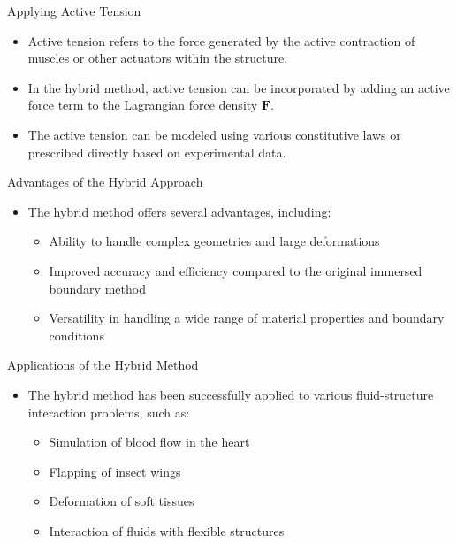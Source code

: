 \documentclass{beamer}
\begin{document}
\begin{frame}{Applying Active Tension}
    \begin{itemize}
        \item Active tension refers to the force generated by the active contraction of muscles or other actuators within the structure.
        \item In the hybrid method, active tension can be incorporated by adding an active force term to the Lagrangian force density $\mathbf{F}$.
        \item The active tension can be modeled using various constitutive laws or prescribed directly based on experimental data.
    \end{itemize}
\end{frame}

\begin{frame}{Advantages of the Hybrid Approach}
    \begin{itemize}
        \item The hybrid method offers several advantages, including:
        \begin{itemize}
            \item Ability to handle complex geometries and large deformations
            \item Improved accuracy and efficiency compared to the original immersed boundary method
            \item Versatility in handling a wide range of material properties and boundary conditions
        \end{itemize}
    \end{itemize}
\end{frame}

\begin{frame}{Applications of the Hybrid Method}
    \begin{itemize}
        \item The hybrid method has been successfully applied to various fluid-structure interaction problems, such as:
        \begin{itemize}
            \item Simulation of blood flow in the heart
            \item Flapping of insect wings
            \item Deformation of soft tissues
            \item Interaction of fluids with flexible structures
        \end{itemize}
    \end{itemize}
\end{frame}
\end{document}
